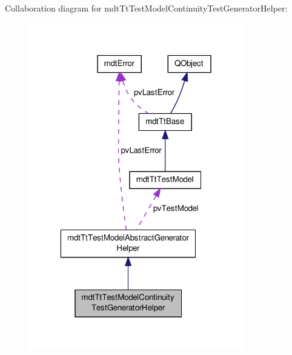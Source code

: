 Collaboration diagram for mdt\-Tt\-Test\-Model\-Continuity\-Test\-Generator\-Helper\-:
\nopagebreak
\begin{figure}[H]
\begin{center}
\leavevmode
\includegraphics[width=265pt]{classmdt_tt_test_model_continuity_test_generator_helper__coll__graph}
\end{center}
\end{figure}
